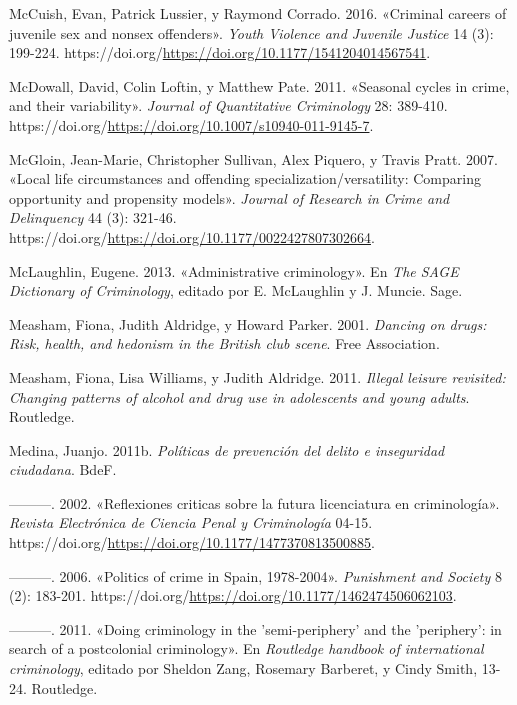 \documentclass[
  spanish,
  letterpaper,
  DIV=11,
  numbers=noendperiod]{scrreprt}
\newlength{\cslhangindent}
\newenvironment{CSLReferences}[2] %
 {\begin{list}{}{%
  \setlength{\itemindent}{0pt}
  \setlength{\leftmargin}{0pt}
  \setlength{\parsep}{0pt}
  \ifodd #1
   \setlength{\leftmargin}{\cslhangindent}
   \setlength{\itemindent}{-1\cslhangindent}
  \fi
  \setlength{\itemsep}{#2\baselineskip}}}
 {\end{list}}
\begin{document}
\begin{CSLReferences}{1}{0}
McCuish, Evan, Patrick Lussier, y Raymond Corrado. 2016. {«Criminal
careers of juvenile sex and nonsex offenders»}. \emph{Youth Violence and
Juvenile Justice} 14 (3): 199-224.
https://doi.org/\url{https://doi.org/10.1177/1541204014567541}.

McDowall, David, Colin Loftin, y Matthew Pate. 2011. {«Seasonal cycles
in crime, and their variability»}. \emph{Journal of Quantitative
Criminology} 28: 389-410.
https://doi.org/\url{https://doi.org/10.1007/s10940-011-9145-7}.

McGloin, Jean-Marie, Christopher Sullivan, Alex Piquero, y Travis Pratt.
2007. {«Local life circumstances and offending
specialization/versatility: Comparing opportunity and propensity
models»}. \emph{Journal of Research in Crime and Delinquency} 44 (3):
321-46. https://doi.org/\url{https://doi.org/10.1177/0022427807302664}.

McLaughlin, Eugene. 2013. {«Administrative criminology»}. En \emph{The
SAGE Dictionary of Criminology}, editado por E. McLaughlin y J. Muncie.
Sage.

Measham, Fiona, Judith Aldridge, y Howard Parker. 2001. \emph{Dancing on
drugs: Risk, health, and hedonism in the British club scene}. Free
Association.

Measham, Fiona, Lisa Williams, y Judith Aldridge. 2011. \emph{Illegal
leisure revisited: Changing patterns of alcohol and drug use in
adolescents and young adults}. Routledge.

Medina, Juanjo. 2011b. \emph{Políticas de prevención del delito e
inseguridad ciudadana}. BdeF.

---------. 2002. {«Reflexiones criticas sobre la futura licenciatura en
criminología»}. \emph{Revista Electrónica de Ciencia Penal y
Criminología} 04-15.
https://doi.org/\url{https://doi.org/10.1177/1477370813500885}.

---------. 2006. {«Politics of crime in Spain, 1978-2004»}.
\emph{Punishment and Society} 8 (2): 183-201.
https://doi.org/\url{https://doi.org/10.1177/1462474506062103}.

---------. 2011. {«Doing criminology in the 'semi-periphery' and the
'periphery': in search of a postcolonial criminology»}. En
\emph{Routledge handbook of international criminology}, editado por
Sheldon Zang, Rosemary Barberet, y Cindy Smith, 13-24. Routledge.


\end{CSLReferences}
\end{document}
